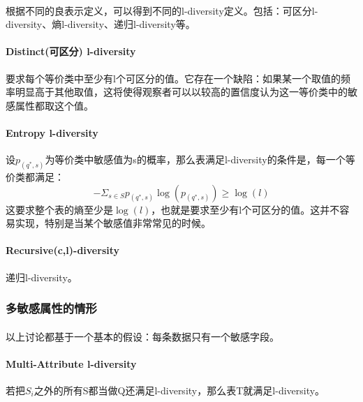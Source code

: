 \documentclass[12pt,a4paper]{article}
\begin{document}
\paragraph{} 根据不同的良表示定义，可以得到不同的l-diversity定义。包括：可区分l-diversity、熵l-diversity、递归l-diversity等。

\paragraph{Distinct(可区分) l-diversity} 要求每个等价类中至少有l个可区分的值。它存在一个缺陷：如果某一个取值的频率明显高于其他取值，这将使得观察者可以以较高的置信度认为这一等价类中的敏感属性都取这个值。

\paragraph{Entropy l-diversity} 设$p_(q^*,s)$为等价类中敏感值为s的概率，那么表满足l-diversity的条件是，每一个等价类都满足：
\begin{equation}
	- \Sigma_{s \in S} p_(q^*,s) \log(p_(q^*,s)) \geq \log(l)
\end{equation}
这要求整个表的熵至少是$\log(l)$，也就是要求至少有l个可区分的值。这并不容易实现，特别是当某个敏感值非常常见的时候。

\paragraph{Recursive(c,l)-diversity} 递归l-diversity。 

\subsubsection{多敏感属性的情形}
\paragraph{} 以上讨论都基于一个基本的假设：每条数据只有一个敏感字段。
\paragraph{Multi-Attribute l-diversity} 若把$S_i$之外的所有S都当做Q还满足l-diversity，那么表T就满足l-diversity。



\end{document}
